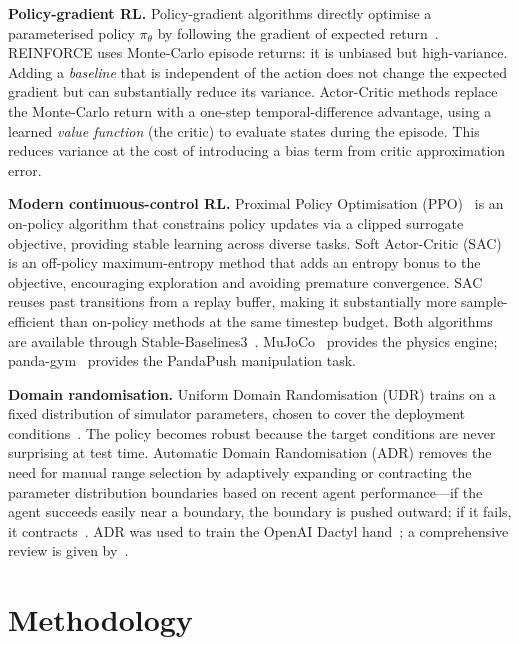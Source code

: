 \documentclass[10pt,twocolumn,letterpaper]{article}
\begin{document}
\textbf{Policy-gradient RL.}
Policy-gradient algorithms directly optimise a parameterised policy $\pi_\theta$ by following the gradient of expected return~\cite{sutton2018reinforcement}. REINFORCE uses Monte-Carlo episode returns: it is unbiased but high-variance. Adding a \emph{baseline} that is independent of the action does not change the expected gradient but can substantially reduce its variance. Actor-Critic methods replace the Monte-Carlo return with a one-step temporal-difference advantage, using a learned \emph{value function} (the critic) to evaluate states during the episode. This reduces variance at the cost of introducing a bias term from critic approximation error.

\textbf{Modern continuous-control RL.}
Proximal Policy Optimisation (PPO)~\cite{schulman2017ppo} is an on-policy algorithm that constrains policy updates via a clipped surrogate objective, providing stable learning across diverse tasks. Soft Actor-Critic (SAC)~\cite{haarnoja2018sac} is an off-policy maximum-entropy method that adds an entropy bonus to the objective, encouraging exploration and avoiding premature convergence. SAC reuses past transitions from a replay buffer, making it substantially more sample-efficient than on-policy methods at the same timestep budget. Both algorithms are available through Stable-Baselines3~\cite{raffin2021stable}. MuJoCo~\cite{todorov2012mujoco} provides the physics engine; panda-gym~\cite{gallouedec2021pandagym} provides the PandaPush manipulation task.

\textbf{Domain randomisation.}
Uniform Domain Randomisation (UDR) trains on a fixed distribution of simulator parameters, chosen to cover the deployment conditions~\cite{tobin2017domain,peng2018sim}. The policy becomes robust because the target conditions are never surprising at test time. Automatic Domain Randomisation (ADR) removes the need for manual range selection by adaptively expanding or contracting the parameter distribution boundaries based on recent agent performance---if the agent succeeds easily near a boundary, the boundary is pushed outward; if it fails, it contracts~\cite{akkaya2019rubiks}. ADR was used to train the OpenAI Dactyl hand~\cite{akkaya2019rubiks}; a comprehensive review is given by~\cite{muratore2022robot}.

\section{Methodology}
\label{sec:method}
\end{document}
